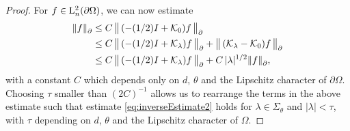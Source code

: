 \begin{proof}
  For $f \in \mathrm{L}^2_n(\partial\Omega)$, we can now estimate
  \begin{align*}
    \| f\|^{}_\partial 
    &\leq C\,  \big\|\,(-(1/2)I + \mathcal{K}_0) f \, \big\|^{}_\partial  \\
    &\leq C\,  \big\|\,(-(1/2)I + \mathcal{K}_\lambda)f\, \big\|^{}_\partial + \big\|\, (\mathcal{K}_\lambda - \mathcal{K}_0)f\, \big\|^{}_\partial \\
    &\leq C\,  \big\|\,(-(1/2)I + \mathcal{K}_\lambda)f\, \big\|^{}_\partial + C \, |\lambda|^{1/2} \|f\|^{}_\partial,
  \end{align*}
  with a constant $C$ which depends only on $d$, $\theta$ and the Lipschitz character of $\partial\Omega$.
  Choosing $\tau$ smaller than $(2C)^{-1}$ allows us to rearrange the terms in the above estimate such that estimate \eqref{eq:inverseEstimate2} holds for $\lambda \in \Sigma_\theta$ and $|\lambda| < \tau$, with $\tau$ depending on $d$, $\theta$ and the Lipschitz character of $\Omega$.


\end{proof}

